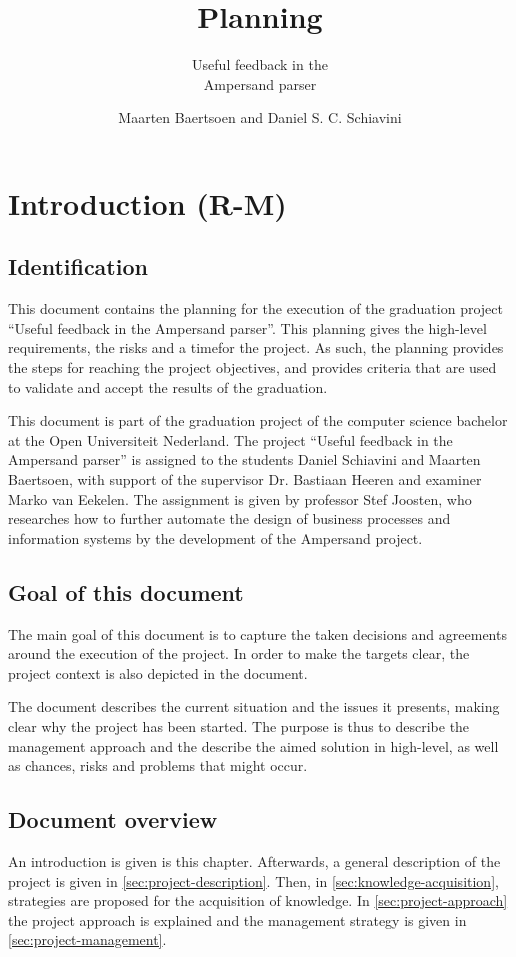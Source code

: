 \documentclass[a4paper,12pt,abstracton,titlepage]{scrartcl}
\author{Maarten Baertsoen and Daniel S. C. Schiavini}
\affil{Open Universiteit Nederland, faculteit Informatica \\
	T61327 - Afstudeerproject bachelor informatica}
\title{Planning}
\subtitle{Useful feedback in the\\ Ampersand parser}
\begin{document}
\maketitle
\newpage

\tableofcontents
\clearpage

\section{Introduction (R-M)}
\subsection{Identification}
This document contains the planning for the execution of the graduation project ``Useful feedback in the Ampersand parser''.
This planning gives the high-level requirements, the risks and a timefor the project.
As such, the planning provides the steps for reaching the project objectives, and provides criteria that are used to validate and accept the results of the graduation.

This document is part of the graduation project of the computer science bachelor at the Open Universiteit Nederland.
The project ``Useful feedback in the Ampersand parser'' is assigned to the students Daniel Schiavini and Maarten Baertsoen, with support of the supervisor Dr. Bastiaan Heeren and examiner Marko van Eekelen.
The assignment is given by professor Stef Joosten, who researches how to further automate the design of business processes and information systems by the development of the Ampersand project.

\subsection{Goal of this document}
The main goal of this document is to capture the taken decisions and agreements around the execution of the project.
In order to make the targets clear, the project context is also depicted in the document.

The document describes the current situation and the issues it presents, making clear why the project has been started.
The purpose is thus to describe the management approach and the describe the aimed solution in high-level, as well as chances, risks and problems that might occur.

\subsection{Document overview}
An introduction is given is this chapter.
Afterwards, a general description of the project is given in \autoref{sec:project-description}.
Then, in \autoref{sec:knowledge-acquisition}, strategies are proposed for the acquisition of knowledge.
In \autoref{sec:project-approach} the project approach is explained and the management strategy is given in \autoref{sec:project-management}.
\end{document}
